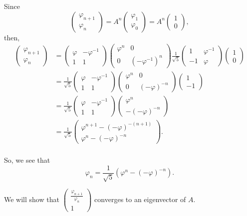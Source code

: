 \documentclass{article}
\begin{document}
Since \[
  \begin{pmatrix} \varphi_{n+1} \\ \varphi_{n} \end{pmatrix} = A^n \begin{pmatrix} \varphi_1 \\ \varphi_0 \end{pmatrix} = A^n \begin{pmatrix} 1 \\ 0 \end{pmatrix},
\] 
then, 
\begin{align*}
  \begin{pmatrix} \varphi_{n+1} \\ \varphi_{n} \end{pmatrix} &= \begin{pmatrix} \varphi & -\varphi^{-1} \\ 1 & 1 \end{pmatrix}
\begin{pmatrix} \varphi^n & 0 \\ 0 & {(-\varphi^{-1})}^n \end{pmatrix}
\frac{1}{\sqrt{5} }\begin{pmatrix} 1 & \varphi^{-1} \\ -1 & \varphi \end{pmatrix} 
\begin{pmatrix} 1 \\ 0 \end{pmatrix} 
\\
&= \frac{1}{\sqrt{5} } \begin{pmatrix} \varphi & -\varphi^{-1} \\ 1 & 1 \end{pmatrix}
\begin{pmatrix} \varphi^n & 0 \\ 0 & {(-\varphi)}^{-n} \end{pmatrix}
\begin{pmatrix} 1 \\ -1 \end{pmatrix} \\
&=  \frac{1}{\sqrt{5} } \begin{pmatrix} \varphi & -\varphi^{-1} \\ 1 & 1 \end{pmatrix}
\begin{pmatrix} \varphi^n \\ -{(-\varphi)}^{-n} \end{pmatrix} \\
&= \frac{1}{\sqrt{5} }\begin{pmatrix} \varphi^{n+1}-{(-\varphi)}^{-(n+1)} \\ \varphi^n-{(-\varphi)}^{-n} \end{pmatrix}.\\
\end{align*}

So, we see that
\[
  \varphi_n = \frac{1}{\sqrt{5} }\left( \varphi^n-{(-\varphi)}^{-n} \right)
.\] 

We will show that $\begin{pmatrix}\frac{\varphi_{n+1}}{\varphi_{n}}\\1\end{pmatrix}$ converges to an eigenvector of $A$. 
\end{document}
